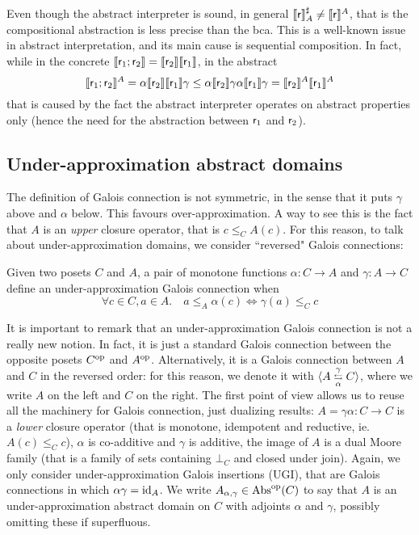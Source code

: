 Even though the abstract interpreter is sound, in general $\llbracket\mathsf{r}\rrbracket^{\sharp}_{A} \neq \llbracket\mathsf{r}\rrbracket^{A}$, that is the compositional abstraction is less precise than the bca. This is a well-known issue in abstract interpretation, and its main cause is sequential composition. In fact, while in the concrete $\llbracket\mathsf{r}_1; \mathsf{r}_2\rrbracket = \llbracket\mathsf{r}_2\rrbracket \llbracket\mathsf{r}_1\rrbracket$, in the abstract
\[
\llbracket\mathsf{r}_1; \mathsf{r}_2\rrbracket^{A} = \alpha \llbracket\mathsf{r}_2\rrbracket \llbracket\mathsf{r}_1\rrbracket \gamma \le \alpha \llbracket\mathsf{r}_2\rrbracket \gamma \alpha \llbracket\mathsf{r}_1\rrbracket \gamma = \llbracket\mathsf{r}_2\rrbracket^{A} \llbracket\mathsf{r}_1\rrbracket^{A}
\]
that is caused by the fact the abstract interpreter operates on abstract properties only (hence the need for the abstraction between $\mathsf{r}_1$ and $\mathsf{r}_2$).

\subsection{Under-approximation abstract domains}
The definition of Galois connection is not symmetric, in the sense that it puts $\gamma$ above and $\alpha$ below. This favours over-approximation. A way to see this is the fact that $A$ is an \emph{upper} closure operator, that is $c \le_C A(c)$. For this reason, to talk about under-approximation domains, we consider ``reversed" Galois connections:
\begin{definition}\label{def:bg:under-gc}
	Given two posets $C$ and $A$, a pair of monotone functions $\alpha : C \rightarrow A$ and $\gamma : A \rightarrow C$ define an under-approximation Galois connection when
	\[
	\forall c \in C, a \in A.\quad a \le_A \alpha(c) \iff \gamma(a) \le_C c
	\]
\end{definition}
It is important to remark that an under-approximation Galois connection is not a really new notion. In fact, it is just a standard Galois connection between the opposite posets $C^{\text{op}}$ and $A^{\text{op}}$. Alternatively, it is a Galois connection between $A$ and $C$ in the reversed order: for this reason, we denote it with $\langle A \mathrel{\substack{\gamma \\ \leftrightarrows \\ \alpha}} C\rangle$, where we write $A$ on the left and $C$ on the right. The first point of view allows us to reuse all the machinery for Galois connection, just dualizing results: $A = \gamma \alpha : C \rightarrow C$ is a \emph{lower} closure operator (that is monotone, idempotent and reductive, ie. $A(c) \le_C c$), $\alpha$ is co-additive and $\gamma$ is additive, the image of $A$ is a dual Moore family (that is a family of sets containing $\bot_C$ and closed under join).
Again, we only consider under-approximation Galois insertions (UGI), that are Galois connections in which $\alpha \gamma = \text{id}_A$. We write $A_{\alpha, \gamma} \in \text{\normalfont Abs}^{\text{op}}(C)$ to say that $A$ is an under-approximation abstract domain on $C$ with adjoints $\alpha$ and $\gamma$, possibly omitting these if superfluous.

